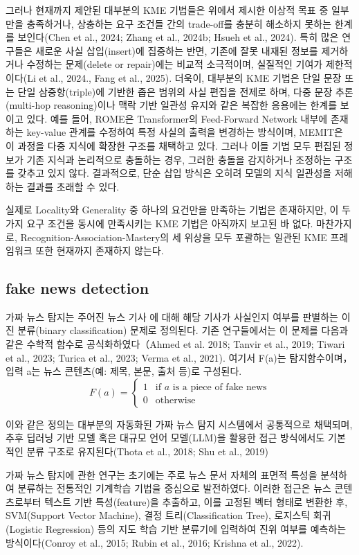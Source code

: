 \documentclass[a4paper,fleqn]{cas-sc}
\begin{document}
그러나 현재까지 제안된 대부분의 KME 기법들은 위에서 제시한 이상적 목표 중 일부만을 충족하거나, 상충하는 요구 조건들 간의 trade-off를 충분히 해소하지 못하는 한계를 보인다(Chen et al., 2024; Zhang et al., 2024b; Hsueh et al., 2024). 특히 많은 연구들은 새로운 사실 삽입(insert)에 집중하는 반면, 기존에 잘못 내재된 정보를 제거하거나 수정하는 문제(delete or repair)에는 비교적 소극적이며, 실질적인 기여가 제한적이다(Li et al., 2024., Fang et al., 2025). 더욱이, 대부분의 KME 기법은 단일 문장 또는 단일 삼중항(triple)에 기반한 좁은 범위의 사실 편집을 전제로 하며, 다중 문장 추론(multi-hop reasoning)이나 맥락 기반 일관성 유지와 같은 복잡한 응용에는 한계를 보이고 있다. 예를 들어, ROME은 Transformer의 Feed-Forward Network 내부에 존재하는 key-value 관계를 수정하여 특정 사실의 출력을 변경하는 방식이며, MEMIT은 이 과정을 다중 지식에 확장한 구조를 채택하고 있다. 그러나 이들 기법 모두 편집된 정보가 기존 지식과 논리적으로 충돌하는 경우, 그러한 충돌을 감지하거나 조정하는 구조를 갖추고 있지 않다. 결과적으로, 단순 삽입 방식은 오히려 모델의 지식 일관성을 저해하는 결과를 초래할 수 있다.

실제로 Locality와 Generality 중 하나의 요건만을 만족하는 기법은 존재하지만, 이 두 가지 요구 조건을 동시에 만족시키는 KME 기법은 아직까지 보고된 바 없다. 마찬가지로, Recognition-Association-Mastery의 세 위상을 모두 포괄하는 일관된 KME 프레임워크 또한 현재까지 존재하지 않는다.

\subsection{fake news detection}

가짜 뉴스 탐지는 주어진 뉴스 기사 에 대해 해당 기사가 사실인지 여부를 판별하는 이진 분류(binary classification) 문제로 정의된다. 기존 연구들에서는 이 문제를 다음과 같은 수학적 함수로 공식화하였다（Ahmed et al. 2018; Tanvir et al., 2019; Tiwari et al., 2023; Turica et al., 2023; Verma et al., 2021). 여기서 F(a)는 탐지함수이며，입력 a는 뉴스 콘텐츠(예: 제목, 본문, 출처 등)로 구성된다.
\[
F(a) =
\begin{cases}
1 & \text{if } a \text{ is a piece of fake news} \\
0 & \text{otherwise}
\end{cases}
\]

이와 같은 정의는 대부분의 자동화된 가짜 뉴스 탐지 시스템에서 공통적으로 채택되며, 추후 딥러닝 기반 모델 혹은 대규모 언어 모델(LLM)을 활용한 접근 방식에서도 기본적인 분류 구조로 유지된다(Thota et al., 2018; Shu et al., 2019)

가짜 뉴스 탐지에 관한 연구는 초기에는 주로 뉴스 문서 자체의 표면적 특성을 분석하여 분류하는 전통적인 기계학습 기법을 중심으로 발전하였다.
이러한 접근은 뉴스 콘텐츠로부터 텍스트 기반 특성(feature)을 추출하고, 이를 고정된 벡터 형태로 변환한 후, SVM(Support Vector Machine), 결정 트리(Classification Tree), 로지스틱 회귀(Logistic Regression) 등의 지도 학습 기반 분류기에 입력하여 진위 여부를 예측하는 방식이다(Conroy et al., 2015; Rubin et al., 2016; Krishna et al., 2022).
\end{document}
